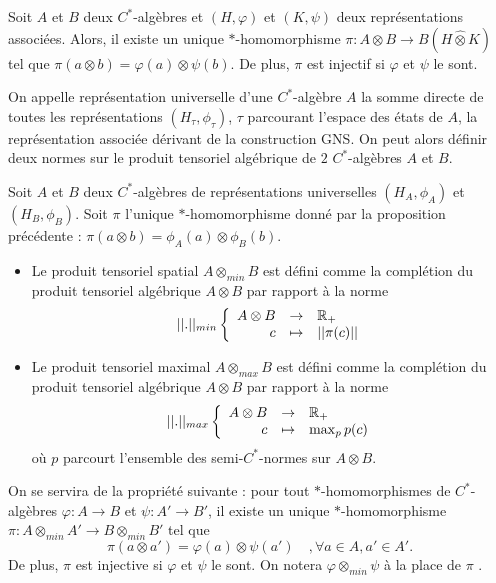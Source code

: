 \begin{prop}
Soit $A$ et $B$ deux $C^*$-algèbres et $(H,\varphi)$ et $(K,\psi)$ deux représentations associées. Alors, il existe un unique $*$-homomorphisme $\pi : A\otimes B \rightarrow B(H\hat\otimes K)$ tel que $\pi(a\otimes b)= \varphi(a)\otimes \psi(b)$. De plus, $\pi$ est injectif si $\varphi$ et $\psi$ le sont.
\end{prop} 

On appelle représentation universelle d'une $C^*$-algèbre $A$ la somme directe de toutes les représentations $(H_\tau,\phi_\tau)$, $\tau$ parcourant l'espace des états de $A$, la représentation associée dérivant de la construction GNS. On peut alors définir deux normes sur le produit tensoriel algébrique de $2$ $C^*$-algèbres $A$ et $B$.

\begin{definition}
Soit $A$ et $B$ deux $C^*$-algèbres de représentations universelles $(H_A, \phi_A)$ et $(H_B, \phi_B)$. Soit $\pi$ l'unique $*$-homomorphisme donné par la proposition précédente : $\pi(a\otimes b ) = \phi_A(a)\otimes \phi_B(b)$.
\begin{itemize}
\item Le produit tensoriel spatial $A\otimes_{min} B$ est défini comme la complétion du produit tensoriel algébrique $A\otimes B$ par rapport à la norme 
\[||.||_{min}\left\{\begin{array}{rcl} A\otimes B & \rightarrow & \mathbb R_+ \\ c & \mapsto & ||\pi(c)||\end{array}\right.\]
\item Le produit tensoriel maximal $A\otimes_{max} B$ est défini comme la complétion du produit tensoriel algébrique $A\otimes B$ par rapport à la norme 
\[||.||_{max}\left\{\begin{array}{rcl} A\otimes B & \rightarrow & \mathbb R_+ \\ c & \mapsto & \max_{p} p(c)\end{array}\right.\]
où $p$ parcourt l'ensemble des semi-$C^*$-normes sur $A\otimes B$.
\end{itemize}
\end{definition}

On se servira de la propriété suivante : pour tout $*$-homomorphismes de $C^*$-algèbres $\varphi : A\rightarrow B$ et $\psi :  A'\rightarrow B'$, il existe un unique $*$-homomorphisme $\pi : A\otimes_{min} A' \rightarrow B\otimes_{min} B'$ tel que 
\[\pi(a\otimes a')=\varphi(a)\otimes \psi (a')\quad , \forall a\in A,a'\in A'.\]
De plus, $\pi $ est injective si $\varphi$ et $\psi$ le sont. On notera $\varphi\otimes_{min}\psi$ à la place de $\pi$ .\\

